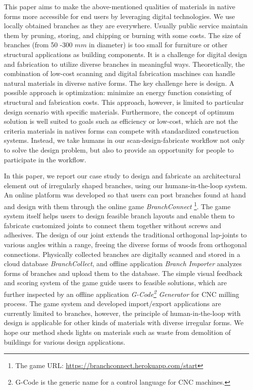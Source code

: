 This paper aims to make the above-mentioned qualities of materials in native forms more accessible for end users by leveraging digital technologies.
We use locally obtained branches as they are everywhere.
Usually public service maintain them by pruning, storing, and chipping or burning with some costs.
The size of branches (from 50 -300 $mm$ in diameter) is too small for furniture or other structural applications as building components.
It is a challenge for digital design and fabrication to utilize diverse branches in meaningful ways.
Theoretically, the combination of low-cost scanning and digital fabrication machines can handle natural materials in diverse native forms.
The key challenge here is design.
A possible approach is optimization: minimize an energy function consisting of structural and fabrication costs.
This approach, however, is limited to particular design scenario with specific materials.
Furthermore, the concept of optimum solution is well suited to goals such as efficiency or low-cost, which are not the criteria materials in natives forms can compete with standardized construction systems.
Instead, we take humans in our scan-design-fabricate workflow not only to solve the design problem, but also to provide an opportunity for people to participate in the workflow.

In this paper, we report our case study to design and fabricate an architectural element out of irregularly shaped branches, using our humans-in-the-loop system.
An online platform was developed so that users can post branches found at hand and design with them through the online game \textit{BranchConnect} \footnote{The game URL:  \url{https://branchconnect.herokuapp.com/start}}.
The game system itself helps users to design feasible branch layouts and enable them to fabricate customized joints to connect them together without screws and adhesives.
The design of our joint extends the traditional orthogonal lap-joints to various angles within a range, freeing the diverse forms of woods from orthogonal connections.
Physically collected branches are digitally scanned and stored in a cloud database \textit{BranchCollect}, and offline application \textit{Branch Importer} analyzes forms of branches and upload them to the database.
The simple visual feedback and scoring system of the game guide users to feasible solutions, which are further inspected by an offline application \textit{G-Code\footnote{G-Code is the generic name for a control language for CNC machines.} Generator} for CNC milling process.
The game system and developed import/export applications are currently limited to branches, however, the principle of human-in-the-loop with design is applicable for other kinds of materials with diverse irregular forms.
We hope our method sheds lights on materials such as waste from demolition of buildings for various design applications.

